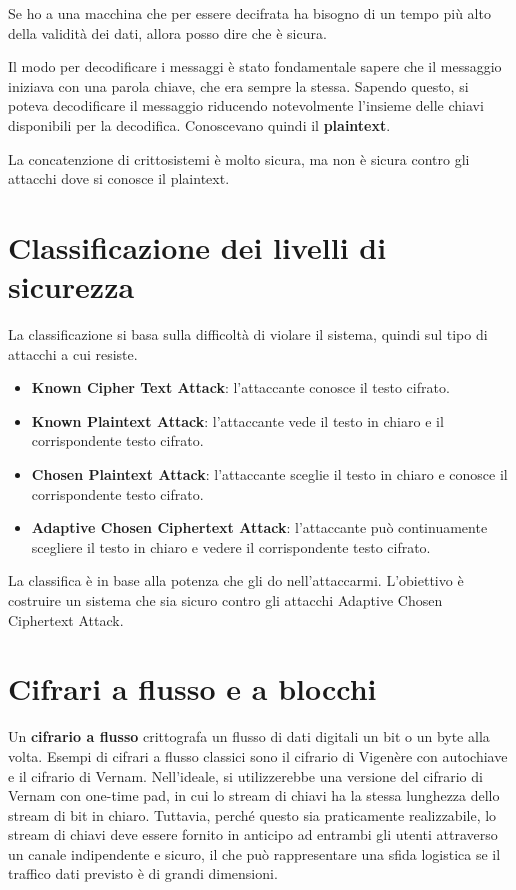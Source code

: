 Se ho a una macchina che per essere decifrata ha bisogno di un tempo più alto della validità 
dei dati, allora posso dire che è sicura.

Il modo per decodificare i messaggi è stato fondamentale sapere che il messaggio iniziava con
una parola chiave, che era sempre la stessa. Sapendo questo, si poteva decodificare il messaggio
riducendo notevolmente l'insieme delle chiavi disponibili per la decodifica.
Conoscevano quindi il \textbf{plaintext}.

La concatenzione di crittosistemi è molto sicura, ma non è sicura contro gli attacchi
dove si conosce il plaintext.

\section{Classificazione dei livelli di sicurezza}
La classificazione si basa sulla difficoltà di violare il sistema, quindi sul tipo di 
attacchi a cui resiste.
\begin{itemize}
    \item \textbf{Known Cipher Text Attack}: l'attaccante conosce il testo cifrato.
    \item \textbf{Known Plaintext Attack}: l'attaccante vede il testo in chiaro e il corrispondente testo cifrato.
    \item \textbf{Chosen Plaintext Attack}: l'attaccante sceglie il testo in chiaro e conosce il corrispondente testo cifrato.
    \item \textbf{Adaptive Chosen Ciphertext Attack}: l'attaccante può continuamente scegliere il testo in chiaro e vedere il corrispondente testo cifrato.
\end{itemize}
La classifica è in base alla potenza che gli do nell'attaccarmi.
L'obiettivo è costruire un sistema che sia sicuro contro 
gli attacchi Adaptive Chosen Ciphertext Attack.
\section{Cifrari a flusso e a blocchi}
Un \textbf{cifrario a flusso} crittografa un flusso di dati digitali un bit
o un byte alla volta. Esempi di cifrari a flusso classici sono il
cifrario di Vigenère con autochiave e il cifrario di Vernam. Nell'ideale,
si utilizzerebbe una versione del cifrario di Vernam con one-time pad, in
cui lo stream di chiavi ha la stessa lunghezza dello stream di bit in chiaro.
Tuttavia, perché questo sia praticamente realizzabile, lo stream di chiavi deve
essere fornito in anticipo ad entrambi gli utenti attraverso un canale indipendente
e sicuro, il che può rappresentare una sfida logistica se il traffico dati
previsto è di grandi dimensioni.

